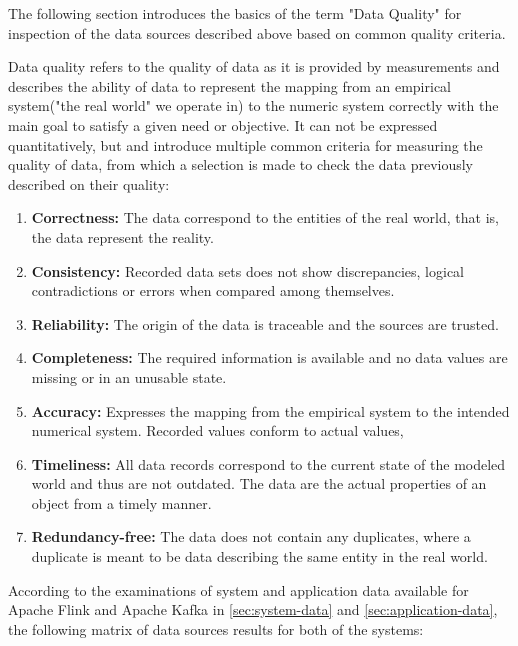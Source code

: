 The following section introduces the basics of the term "Data Quality" for inspection of the data sources
described above based on common quality criteria.

Data quality refers to the quality of data as it is provided by measurements and describes the
ability of data to represent the mapping from an empirical system("the real world" we operate in)
to the numeric system correctly with the main goal to satisfy a given need or objective.
It can not be expressed quantitatively, but \cite{Daqua13} and  \cite{Ebert07} introduce multiple
common criteria for measuring the quality of data, from which a selection is made to check the data
previously described on their quality:

\begin{enumerate}
    \item \textbf{Correctness:}
    The data correspond to the entities of the real world, that is, the data represent the reality.

    \item \textbf{Consistency:}
    Recorded data sets does not show discrepancies, logical contradictions or errors when compared
    among themselves.

    \item \textbf{Reliability:}
    The origin of the data is traceable and the sources are trusted.

    \item \textbf{Completeness:}
    The required information is available and no data values are missing or in an unusable state.

    \item \textbf{Accuracy:}
    Expresses the mapping from the empirical system to the intended numerical system. Recorded values
    conform to actual values,

    \item \textbf{Timeliness:}
    All data records correspond to the current state of the modeled world and thus are not outdated.
    The data are the actual properties of an object from a timely manner.

    \item \textbf{Redundancy-free:}
    The data does not contain any duplicates, where a duplicate is meant to be data describing the same entity
    in the real world.
\end{enumerate}

According to the examinations of system and application data available for Apache Flink and Apache Kafka in
\autoref{sec:system-data} and \autoref{sec:application-data}, the following matrix of data sources results
for both of the systems:

